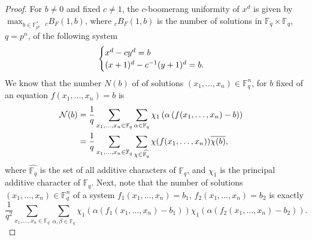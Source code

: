\documentclass[11pt]{article}
\def\cN{{\mathcal N}}
\def\F{{\mathbb F}}
\def\\{\cr}
\begin{document}
\begin{proof}
For $b \neq 0$ and fixed $c\neq 1$, the $c$-boomerang uniformity of $x^d$ is given by $\displaystyle \max_{b \in \mathbb{F}_{p^n}^*}~  _cB_F(1,b) $, where $_cB_F(1,b)$ is the number of solutions in $\mathbb{F}_{q}\times \mathbb{F}_{q}$, $q=p^n$, of the following system
\begin{equation}
\label{eq:eq3.1}
\begin{cases}
 x^d-cy^d=b \\
(x+1)^d-c^{-1} (y+1)^d=b.
\end{cases}
\end{equation}
We know  that the number  $N(b)$  of of solutions $(x_1,\ldots,x_n)\in\F_q^n$, for $b$ fixed of an equation $f(x_1,\ldots,x_n)=b$ is
\begin{align*}
\cN(b)
&= \frac{1}{q}\sum_{x_1,\ldots,x_n\in \F_q}\sum_{\alpha\in\F_q} \chi_1\left(\alpha \left( f(x_1,\ldots,x_n)- b\right)\right)\\
&=\frac{1}{q}\sum_{x_1,\ldots,x_n\in \F_q}\sum_{\chi\in \widehat{\F_q}}\chi(f(x_1,\ldots,x_n))\overline{\chi(b)},
\end{align*}
where $\widehat{\F_q}$ is the set of all additive characters of $\F_q$, and $\chi_1$ is the principal additive character of  $\F_q$. Next, note  that the number of solutions  $(x_1,\ldots,x_n)\in\F_q^n$ of a system $f_1(x_1,\ldots,x_n)=b_1$,  $f_2(x_1,\ldots,x_n)=b_2$ is exactly
\[
\frac{1}{q^2}\sum_{x_1,\ldots,x_n\in \F_q}\sum_{\alpha,\beta\in\F_q} \chi_1\left(\alpha\left(f_1(x_1,\ldots,x_n)-b_1 \right) \right) \chi_1\left(\alpha\left(f_2(x_1,\ldots,x_n)-b_2 \right) \right).
\]

\end{proof}
\end{document}
